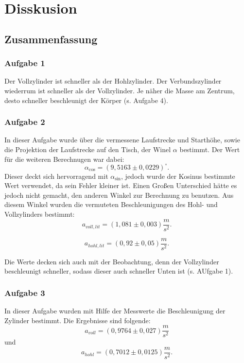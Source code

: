 \chapter{Disskusion}
\label{ch:diskussion}

\section{Zusammenfassung}
\subsection{Aufgabe 1}
Der Vollzylinder ist schneller als der Hohlzylinder. Der Verbundszylinder wiederrum ist schneller als der Vollzylinder. Je näher die Masse am Zentrum, desto schneller beschleunigt der Körper (s. Aufgabe 4).

\subsection{Aufgabe 2}
In dieser Aufgabe wurde über die vermessene Laufstrecke und Starthöhe, sowie die Projektion der Laufstrecke auf den Tisch, der Winel $\alpha$ bestimmt. Der Wert für die weiteren Berechnugen war dabei:
\begin{equation}
\boxed{
    \alpha_{\cos} = (9,5163 \pm 0,0229) ^\circ
}.
\end{equation}
Dieser deckt sich hervorragend mit $\alpha_{\sin}$, jedoch wurde der Kosinus bestimmte Wert verwendet, da sein Fehler kleiner ist. Einen Großen Unterschied hätte es jedoch nicht gemacht, den anderen Winkel zur Berechnung zu benutzen.
Aus diesem Winkel wurden die vermuteten Beschleunigungen des Hohl- und Vollzylinders bestimmt:
\begin{equation}
    \boxed{
        a_{voll,lit} = (1,081 \pm 0,003) \frac{m}{s^2}
    }.
\end{equation}

\begin{equation}
    \boxed{
        a_{hohl,lit} = (0,92 \pm 0,05) \frac{m}{s^2}
    }.
\end{equation}

Die Werte decken sich auch mit der Beobachtung, denn der Vollzylinder beschleunigt schneller, sodass dieser auch schneller Unten ist (s. AUfgabe 1).

\subsection{Aufgabe 3}
In dieser Aufgabe wurden mit Hilfe der Messwerte die Beschleunigung der Zylinder bestimmt. Die Ergebnisse sind folgende:
\begin{equation}
    \boxed{
        a_{voll} = (0,9764 \pm 0,027) \frac{m}{s^2}
    }
\end{equation}
und
\begin{equation}
\boxed{
    a_{hohl} = (0,7012 \pm 0,0125) \frac{m}{s^2}
}.
\end{equation}

